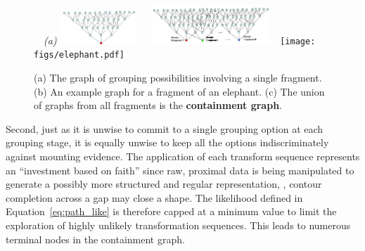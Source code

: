 \begin{figure}[ht]
\hbox{
\vbox{
\hbox{
{\footnotesize\textit{(a)}}
\includegraphics[width=0.25\textwidth]{figs/hypothesis-tree.jpg}
}
\hbox{
\includegraphics[width=0.4\textwidth]{figs/merged-hypothesis-trees.jpg}
}
}
 \hspace{0.1cm} \texttt{[image: figs/elephant.pdf]}
}
  \caption{\FigureFont (a) The graph of grouping possibilities involving
a single fragment. (b) An example graph for a fragment of an elephant. (c) The
union of  graphs  from all fragments is the   {\bf containment graph}.}
  \label{fig:containment:graph}
\end{figure}



Second, just as it is unwise to commit to a single grouping option at each grouping stage, it is equally unwise to keep all the options indiscriminately
against mounting evidence. The application of each transform sequence represents an ``investment based on faith'' since raw, proximal data is being manipulated to generate a possibly more structured and regular representation, \eg,
contour completion across a gap may close a shape.
The likelihood defined in Equation~\ref{eq:path_like} is therefore capped
at a minimum value to limit the exploration of highly unlikely transformation sequences. This leads to numerous terminal nodes in the containment graph.  


